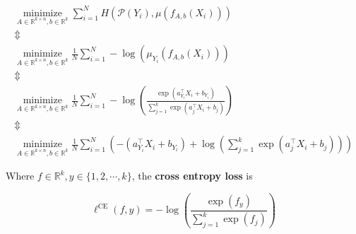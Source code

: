 \documentclass{report}
\begin{document}
\begin{concept}
    $$
    \begin{gathered}
    \underset{A \in \mathbb{R}^{k \times n}, b \in \mathbb{R}^{k}}{\operatorname{minimize}} \sum_{i=1}^{N} H\left(\mathcal{P}\left(Y_{i}\right), \mu\left(f_{A, b}\left(X_{i}\right)\right)\right) \\
    \mathbb{\Updownarrow} \\
    \underset{A \in \mathbb{R}^{k \times n}, b \in \mathbb{R}^{k}}{\operatorname{minimize}} \frac{1}{N} \sum_{i=1}^{N}-\log \left(\mu_{Y_{i}}\left(f_{A, b}\left(X_{i}\right)\right)\right) \\
    \mathbb{\Updownarrow} \\
    \underset{A \in \mathbb{R}^{k \times n}, b \in \mathbb{R}^{k}}{\operatorname{minimize}} \frac{1}{N} \sum_{i=1}^{N}-\log \left(\frac{\exp \left(a_{Y_{i}}^{\top} X_{i}+b_{Y_{i}}\right)}{\sum_{j=1}^{k} \exp \left(a_{j}^{\top} X_{i}+b_{j}\right)}\right) \\
    \mathbb{\Updownarrow} \\
    \underset{A \in \mathbb{R}^{k \times n}, b \in \mathbb{R}^{k}}{\operatorname{minimize}} \frac{1}{N} \sum_{i=1}^{N}\left(-\left(a_{Y_{i}}^{\top} X_{i}+b_{Y_{i}}\right)+\log \left(\sum_{j=1}^{k} \exp \left(a_{j}^{\top} X_{i}+b_{j}\right)\right)\right)
    \end{gathered}
    $$
\end{concept}

\begin{definition}
    Where $f \in \mathbb{R}^{k}, y \in \{1, 2, \cdots, k\}$, the \textbf{cross entropy loss} is

    $$
    \ell^{\mathrm{CE}}(f, y)=-\log \left(\frac{\exp \left(f_{y}\right)}{\sum_{j=1}^{k} \exp \left(f_{j}\right)}\right)
    $$
\end{definition}
\end{document}
